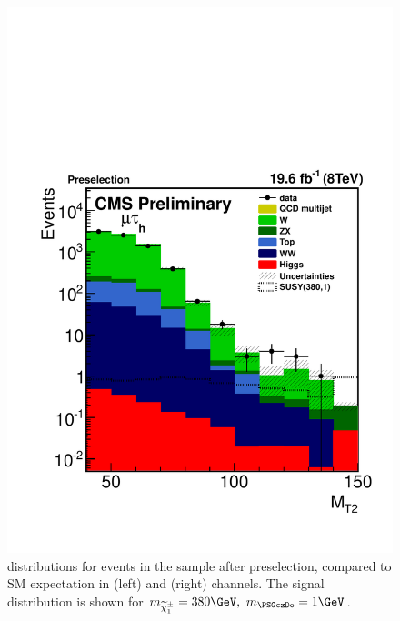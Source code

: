 \begin{figure}[!htb]
\includegraphics[angle=0,scale=0.375]{SelectionMuTau/MT2_mutau.pdf}
\caption{\mttwo  distributions for events in the sample after preselection, compared to SM expectation in (left) \eTau and (right) \muTau channels. The signal distribution is shown for $m_{\chione}=380\GeV,~m_{\PSGczDo}=1\GeV$.}
\label{fig:mt2leptontau}
\end{figure}






